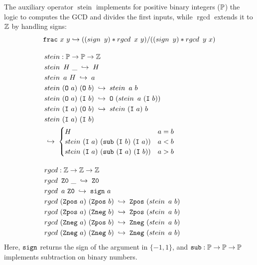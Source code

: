 \begin{definition}\label{def:frac}
The auxiliary operator $\mathop{stein}$ implements for positive binary integers ($\mathbb{P}$) the logic to computes the GCD and divides the first inputs, while $\mathop{rgcd}$ extends it to $\mathbb{Z}$ by handling signs:
\begin{align*}
&\texttt{\upshape{frac}}~x~y \hookrightarrow ((\mathop{sign}~y) * \mathop{rgcd}~x~y) \slash ((\mathop{sign}~y) * \mathop{rgcd}~y~x) \\[1em]
& \mathop{stein}: \mathbb{P} \rightarrow \mathbb{P} \rightarrow \mathbb{Z} \\
& \mathop{stein}~H~\_ \;\hookrightarrow\; H \\
& \mathop{stein}~a~H \;\hookrightarrow\; a \\
& \mathop{stein}~(\texttt{\upshape{O}}~a)~(\texttt{\upshape{O}}~b) 
   \;\hookrightarrow\; \mathop{stein}~a~b \\
& \mathop{stein}~(\texttt{\upshape{O}}~a)~(\texttt{\upshape{I}}~b) 
   \;\hookrightarrow\; \texttt{\upshape{O}}~(\mathop{stein}~a~(\texttt{\upshape{I}}~b)) \\
& \mathop{stein}~(\texttt{\upshape{I}}~a)~(\texttt{\upshape{O}}~b) 
   \;\hookrightarrow\; \mathop{stein}~(\texttt{\upshape{I}}~a)~b \\
& \mathop{stein}~(\texttt{\upshape{I}}~a)~(\texttt{\upshape{I}}~b) \\
&   \;\hookrightarrow\; \begin{cases}
       H & a = b \\
       \mathop{stein}~(\texttt{\upshape{I}}~a)~(\texttt{\upshape{sub}}~(\texttt{\upshape{I}}~b)~(\texttt{\upshape{I}}~a)) & a < b \\
       \mathop{stein}~(\texttt{\upshape{I}}~a)~(\texttt{\upshape{sub}}~(\texttt{\upshape{I}}~a)~(\texttt{\upshape{I}}~b)) &  a > b
     \end{cases} \\[1em]
& \mathop{rgcd}: \mathbb{Z} \rightarrow \mathbb{Z} \rightarrow \mathbb{Z} \\
& \mathop{rgcd}~\texttt{\upshape{Z0}}~\_ \;\hookrightarrow\; \texttt{\upshape{Z0}} \\
& \mathop{rgcd}~a~\texttt{\upshape{Z0}} \;\hookrightarrow\; \texttt{\upshape{sign}}~a \\
& \mathop{rgcd}~(\texttt{\upshape{Zpos}}~a)~(\texttt{\upshape{Zpos}}~b) 
  \;\hookrightarrow\; \texttt{\upshape{Zpos}}~(\mathop{stein}~a~b) \\
& \mathop{rgcd}~(\texttt{\upshape{Zpos}}~a)~(\texttt{\upshape{Zneg}}~b) 
  \;\hookrightarrow\; \texttt{\upshape{Zpos}}~(\mathop{stein}~a~b) \\
& \mathop{rgcd}~(\texttt{\upshape{Zneg}}~a)~(\texttt{\upshape{Zpos}}~b) 
  \;\hookrightarrow\; \texttt{\upshape{Zneg}}~(\mathop{stein}~a~b) \\
& \mathop{rgcd}~(\texttt{\upshape{Zneg}}~a)~(\texttt{\upshape{Zneg}}~b) 
  \;\hookrightarrow\; \texttt{\upshape{Zneg}}~(\mathop{stein}~a~b)
\end{align*}
Here, $\texttt{\upshape{sign}}$ returns the sign of the argument in $\{-1, 1\}$, and $\texttt{\upshape{sub}}: \mathbb{P} \rightarrow \mathbb{P} \rightarrow \mathbb{P}$ implements subtraction on binary numbers.
\end{definition}

